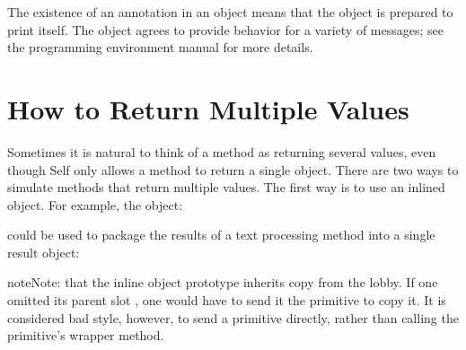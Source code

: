 \documentclass[letterpaper,10pt,english]{sphinxmanual}
\begin{document}
The existence of an  annotation in an object means that the object is prepared to print
itself. The object agrees to provide behavior for a variety of messages; see the programming environment
manual for more details.


\section{How to Return Multiple Values}
\label{\detokenize{progguid:id2}}\label{\detokenize{progguid:how-to-return-multiple-values}}
Sometimes it is natural to think of a method as returning several values, even though Self only
allows a method to return a single object. There are two ways to simulate methods that return
multiple values. The first way is to use an inlined object. For example, the object:

\begin{sphinxVerbatim}[commandchars=\\\{\}]
       
\end{sphinxVerbatim}

could be used to package the results of a text processing method into a single result object:

\begin{sphinxVerbatim}[commandchars=\\\{\}]
  
                
      
            
     
\end{sphinxVerbatim}

\begin{sphinxadmonition}{note}{Note:}
that the inline object prototype inherits copy from the lobby. If one omitted its parent slot , one would have to
send it the  primitive to copy it. It is considered bad style, however, to send a primitive directly,
rather than calling the primitive’s wrapper method.
\end{sphinxadmonition}
\end{document}
